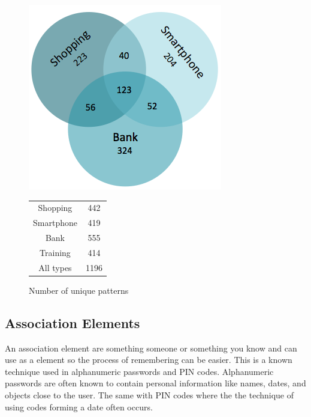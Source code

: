     \begin{figure}[H]
      \centering
      \begin{minipage}[b]{0.40\linewidth}
      \centering
        \includegraphics[scale=0.4]{pics/analysis/uniquePatternsVenn.png}
      \end{minipage}%
      \begin{minipage}[b]{0.30\linewidth}
        \centering
        \begin{tabular}{ c | c }
          \hline
          Shopping &  442 \\
          Smartphone & 419 \\
          Bank & 555 \\
          Training & 414 \\ \hline \hline
          All types & 1196 \\ \hline
        \end{tabular}
        \vspace{1cm}
      \end{minipage}
      \caption{Number of unique patterns}
      \label{fig:test}
    \end{figure}
    

  \subsection{Association Elements} \label{sec:associationelements}
    An association element are something someone or something you know and can use as a element so the process of remembering can be easier. This is a known technique used in alphanumeric passwords and PIN codes. Alphanumeric passwords are often known to contain personal information like names, dates, and objects close to the user. The same with PIN codes where the the technique of using codes forming a date often occurs. 

